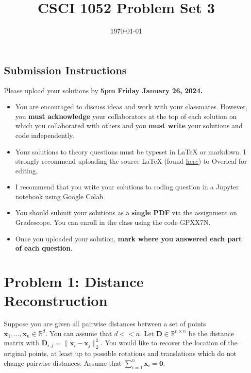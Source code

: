 \documentclass{article}
\title{CSCI 1052 Problem Set 3}
\author{} %
\date{\today}
\begin{document}
\maketitle

\subsection*{Submission Instructions}

Please upload your solutions by
\textbf{5pm Friday January 26, 2024.}
\begin{itemize}
\item You are encouraged to discuss ideas
and work with your classmates. However, you
\textbf{must acknowledge} your collaborators
at the top of each solution on which
you collaborated with others 
and you \textbf{must write} your solutions and code
independently.
\item Your solutions to theory questions must
be typeset in LaTeX or markdown.
I strongly recommend uploading the source LaTeX (found 
\href{https://www.rtealwitter.com/rads2024/psets/pset3.tex}{here})
to Overleaf for editing.
\item I recommend that you write your solutions to coding question in a Jupyter notebook using Google Colab.
\item You should submit your solutions as a \textbf{single PDF} via the assignment on Gradescope. You can enroll in the class using the code GPXX7N.
\item Once you uploaded your solution, \textbf{mark where you answered each part of each question}.
\end{itemize}

\newpage

\section*{Problem 1: Distance Reconstruction}

Suppose you are given all pairwise distances between a set of points $\mathbf{x}_1, \ldots, \mathbf{x}_n \in \mathbb{R}^d$.
You can assume that $d << n$.
Let $\mathbf{D} \in \mathbb{R}^{n \times n}$ be the distance matrix with $\mathbf{D}_{i,j} = \| \mathbf{x}_i - \mathbf{x}_j \|_2^2$.
You would like to recover the location of the original points, at least up to possible rotations and translations which do not change pairwise distances.
Assume that $\sum_{i=1}^n \mathbf{x}_i = \mathbf{0}$.
\end{document}
